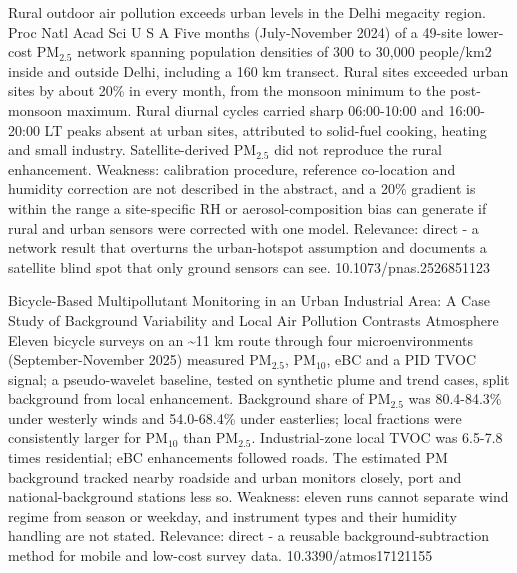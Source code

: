 \documentclass[10pt]{article}
\begin{document}
{Rural outdoor air pollution exceeds urban levels in the Delhi megacity region.}
{Proc Natl Acad Sci U S A}
{Five months (July-November 2024) of a 49-site lower-cost PM$_{2.5}$ network spanning population densities of 300 to 30,000 people/km2 inside and outside Delhi, including a 160 km transect. Rural sites exceeded urban sites by about 20\% in every month, from the monsoon minimum to the post-monsoon maximum. Rural diurnal cycles carried sharp 06:00-10:00 and 16:00-20:00 LT peaks absent at urban sites, attributed to solid-fuel cooking, heating and small industry. Satellite-derived PM$_{2.5}$ did not reproduce the rural enhancement. Weakness: calibration procedure, reference co-location and humidity correction are not described in the abstract, and a 20\% gradient is within the range a site-specific RH or aerosol-composition bias can generate if rural and urban sensors were corrected with one model. Relevance: direct - a network result that overturns the urban-hotspot assumption and documents a satellite blind spot that only ground sensors can see.}
{10.1073/pnas.2526851123}

{Bicycle-Based Multipollutant Monitoring in an Urban Industrial Area: A Case Study of Background Variability and Local Air Pollution Contrasts}
{Atmosphere}
{Eleven bicycle surveys on an \textasciitilde{}11 km route through four microenvironments (September-November 2025) measured PM$_{2.5}$, PM$_{10}$, eBC and a PID TVOC signal; a pseudo-wavelet baseline, tested on synthetic plume and trend cases, split background from local enhancement. Background share of PM$_{2.5}$ was 80.4-84.3\% under westerly winds and 54.0-68.4\% under easterlies; local fractions were consistently larger for PM$_{10}$ than PM$_{2.5}$. Industrial-zone local TVOC was 6.5-7.8 times residential; eBC enhancements followed roads. The estimated PM background tracked nearby roadside and urban monitors closely, port and national-background stations less so. Weakness: eleven runs cannot separate wind regime from season or weekday, and instrument types and their humidity handling are not stated. Relevance: direct - a reusable background-subtraction method for mobile and low-cost survey data.}
{10.3390/atmos17121155}
\end{document}

